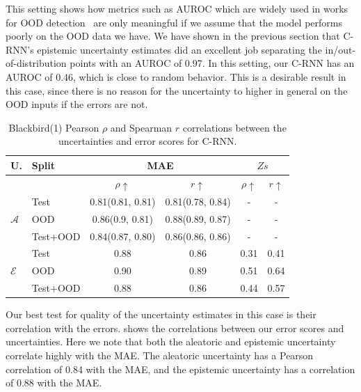 This setting shows how metrics such as AUROC which are widely used in works for OOD detection~\citep{liang2017enhancing, hein2019relu, lee2017training} are only meaningful if we assume that the model performs poorly on the OOD data we have. We have shown in the previous section that C-RNN's epistemic uncertainty estimates did an excellent job separating the in/out-of-distribution points with an AUROC of 0.97. In this setting, our C-RNN has an AUROC of 0.46, which is close to random behavior. This is a desirable result in this case, since there is no reason for the uncertainty to higher in general on the OOD inputs if the errors are not.


\begin{table}[h]
\centering
    \begin{tabular}{l l c c c c}  
        \toprule
        U. & Split & \multicolumn{2}{c}{MAE} & \multicolumn{2}{c}{$Zs$}\\
        \midrule
        & & $\rho \uparrow$ & $r \uparrow$ & $\rho \uparrow$ & $r \uparrow$ \\
        \multirow{3}{*}{$\mathcal{A}$} 
            & Test     & 0.81(0.81, 0.81) & 0.81(0.78, 0.84) & - & - \\  
            & OOD      & 0.86(0.9, 0.81) & 0.88(0.89, 0.87) & - & - \\  
            & Test+OOD & 0.84(0.87, 0.80) & 0.86(0.86, 0.86) & - & - \\ 

        \midrule
        \multirow{3}{*}{$\mathcal{E}$} 
            & Test     & 0.88  & 0.86 &  0.31  & 0.41 \\  
            & OOD      & 0.90 & 0.89 &  0.51 & 0.64 \\
            & Test+OOD & 0.88 & 0.86 &  0.44 & 0.57 \\ 

        \toprule
    \end{tabular}
    \caption{Blackbird(1) Pearson $\rho$ and Spearman $r$ correlations between the uncertainties and error scores for C-RNN.}
    \label{tbl:bb1_corr}
\end{table}

Our best test for quality of the uncertainty estimates in this case is their correlation with the errors.  shows the correlations between our error scores and uncertainties.  Here we note that both the aleatoric and epistemic uncertainty correlate highly with the MAE. The aleatoric uncertainty has a Pearson correlation of 0.84 with the MAE, and the epistemic uncertainty has a correlation of 0.88 with the MAE. 

